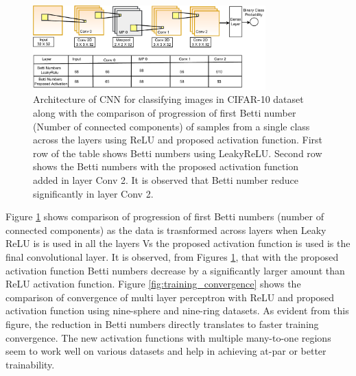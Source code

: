 \documentclass[wcp]{jmlr}
\begin{document}
\begin{figure}[htp]
\begin{center}
\includegraphics[width=0.8\textwidth]{images/cifar_10_arch.drawio}
\caption{Architecture of CNN for classifying images in CIFAR-10 dataset along with the comparison  of progression of first Betti number (Number of connected components) of samples from a single class across the layers using ReLU  and proposed activation function. First row of the table shows Betti numbers using LeakyReLU. Second row shows the Betti numbers with the proposed activation function added in layer Conv 2. It is observed that Betti number reduce significantly in layer Conv 2.
}
\label{fig:cifar_10_arch}
\end{center}
\end{figure}


Figure \ref{fig:cifar_10_arch} shows  comparison of progression of first Betti numbers (number of connected components) as the data is trasnformed across layers when Leaky ReLU is is used in all the layers Vs the proposed activation function is used is the final convolutional layer.  It is observed, from Figures \ref{fig:cifar_10_arch},  that with the proposed activation function Betti numbers decrease  by a significantly larger amount than ReLU activation function. Figure \ref{fig:training_convergence} shows the comparison of convergence  of multi layer perceptron with ReLU and proposed activation function using nine-sphere and nine-ring datasets. As evident from this figure, the reduction in Betti numbers  directly translates to faster training convergence. The new activation functions with multiple many-to-one regions seem to work well on various datasets and help in achieving at-par or better trainability.
\end{document}

